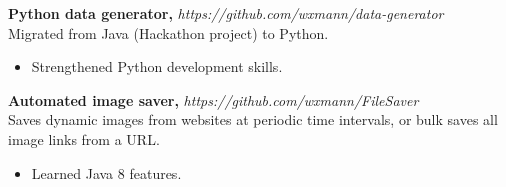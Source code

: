 \documentclass[9pt]{article}
\newcommand{\jobPosition}[1]{\vspace{2pt} #1}
\newcommand{\jobSummary}[1]{\vspace{2pt} \\ #1}
\newenvironment{jobHighlights}
	{\vspace{2pt}\begin{itemize}[noitemsep,nolistsep]}{\end{itemize} \vspace{6pt}}
\begin{document}
\jobPosition{\textbf{Python data generator,} \textit{https://github.com/wxmann/data-generator}}
\jobSummary{Migrated from Java (Hackathon project) to Python.}
\begin{jobHighlights}
	\item Strengthened Python development skills.
\end{jobHighlights}

\jobPosition{\textbf{Automated image saver,} \textit{https://github.com/wxmann/FileSaver}}
\jobSummary{Saves dynamic images from websites at periodic time intervals, or bulk saves all image links from a URL.}
\begin{jobHighlights}
	\item Learned Java 8 features.
\end{jobHighlights}
\end{document}
